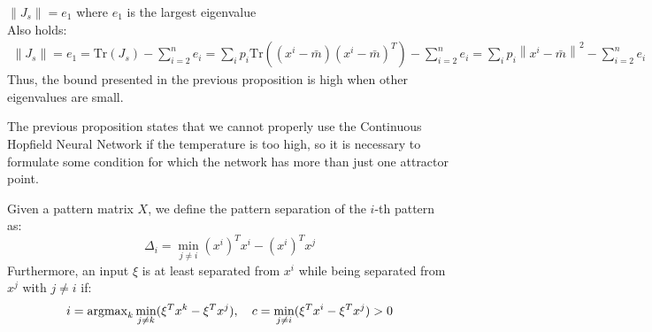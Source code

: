 \begin{remark}
	$\left\|J_s\right\| = e_1$ where $e_1$ is the largest eigenvalue \\
	Also holds:  \begin{align*}
		\left\|J_s\right\| = e_1 = \text{Tr}\left(J_s\right) - \sum_{i=2}^{n} e_i = \sum_i p_i \text{Tr}\left((x^i-\bar{m})(x^i - \bar{m})^T\right) - \sum_{i=2}^{n} e_i = \sum_i p_i \left\|x^i -\bar{m}\right\|^2 - \sum_{i=2}^{n} e_i
	\end{align*}
	Thus, the bound presented in the previous proposition is high when other eigenvalues are small.
\end{remark}
The previous proposition states that we cannot properly use the Continuous Hopfield Neural Network if the temperature is too high, so it is necessary to formulate some condition for which the network has more than just one attractor point.
\begin{definition}[separation]
	Given a pattern matrix $X$, we define the pattern separation of the $i$-th pattern as:
	\[
	\Delta_i = \min_{j \neq i} (x^i)^Tx^i - (x^i)^T x^j
	\]
	Furthermore, an input $\xi$ is at least separated from $x^i$ while being separated from $x^j$ with $j \neq i$ if:
	\[
	i = \operatorname{argmax}_{k} \min_{j \neq k} (\xi^T x^k - \xi^Tx^j), \quad c =  \min_{j \neq i} (\xi^T x^i - \xi^Tx^j) > 0
	\]
\end{definition}
